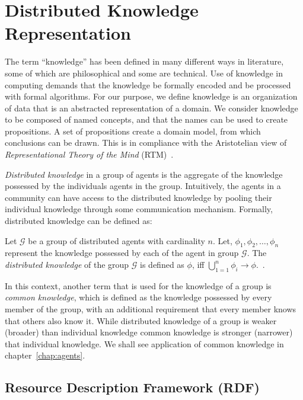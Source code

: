 \section{Distributed Knowledge Representation}
\label{sec:knowledge:dk}

The term ``knowledge'' has been defined in many different ways in literature, some of which are philosophical and some are
technical. Use of knowledge in computing demands that the knowledge be formally encoded and be processed with formal algorithms.
For our purpose, we define knowledge is an organization of data that is an abstracted representation of a domain. We consider
knowledge to be composed of named concepts, and that the names can be used to create propositions. A set of propositions create
a domain model, from which conclusions can be drawn. This is in compliance with the Aristotelian view of {\em Representational 
Theory of the Mind} (RTM)~\citep{Stanford:2020}.

{\em Distributed knowledge} in a group of agents is the aggregate of the knowledge possessed by the individuals agents in the group. 
Intuitively, the agents in a community can have access to the distributed knowledge by pooling their individual knowledge through 
some communication mechanism. Formally, distributed knowledge can be defined as:

\begin{definition} 
	Let $\mathcal{G}$ be a group of distributed agents with cardinality $n$. Let, $\phi_1, \phi_2, \dots, \phi_n$ represent the
	knowledge possessed by each of the agent in group $\mathcal{G}$. The {\em distributed knowledge} of the group $\mathcal{G}$ is
	defined as $\phi$, iff $\bigcup_{1=1}^n \phi_i \rightarrow \phi$.~\citep{Roelofsen:2007}.
\end{definition}

In this context, another term that is used for the knowledge of a group is {\em common knowledge}, which is defined as the knowledge 
possessed by every member of the group, with an additional requirement that every member knows that others also know it. While 
distributed knowledge of a group is weaker (broader) than individual knowledge common knowledge is stronger (narrower) that individual 
knowledge. We shall see application of common knowledge in chapter~\ref{chap:agents}.  

\subsection{Resource Description Framework (RDF)}

